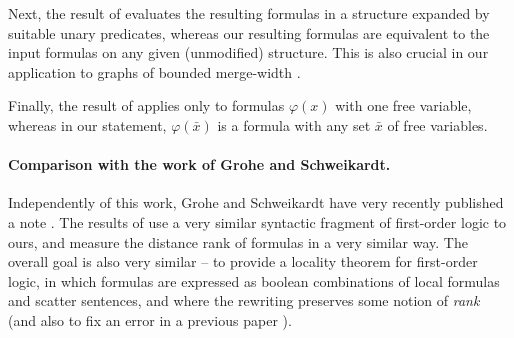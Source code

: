 \documentclass[11pt]{article}
\theoremstyle{remark}
\def\phi{\varphi}
\begin{document}
Next, the result of \cite{gks} evaluates the resulting formulas in a structure expanded by suitable unary predicates, whereas our resulting formulas are equivalent to the input formulas on any given (unmodified) structure. This is also crucial in our application to graphs of bounded merge-width \cite{mw-stoc}.


Finally, the result of \cite{gks} applies only to formulas $\phi(x)$ with one free variable, whereas in our statement, $\phi(\bar x)$ is a formula with any set $\bar x$ of free variables.




\paragraph{Comparison with the work of Grohe and Schweikardt.}
Independently of this work, Grohe and Schweikardt have very recently published a note \cite{grohe2026rankpreservinggaifmannormalform}.
The results of \cite{grohe2026rankpreservinggaifmannormalform} use a very similar syntactic fragment of first-order logic to ours, and measure the distance rank of formulas in a very similar way. The overall goal is also very similar -- to provide a locality theorem for first-order logic, in which formulas are expressed as boolean combinations of local formulas and scatter sentences,
and where the rewriting preserves some notion of \emph{rank} (and also 
to fix an error in a previous paper \cite{gs-pods}).
\end{document}
